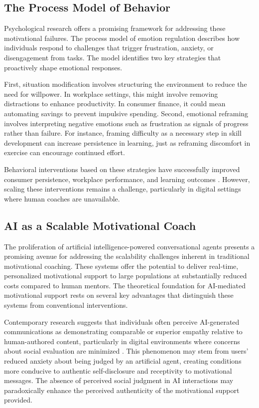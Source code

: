 \documentclass[11pt]{report}
\begin{document}
\begin{mainf}
\subsection*{The Process Model of Behavior}

Psychological research offers a promising framework for addressing these motivational failures. The process model of emotion regulation \citep{gross1998antecedent} describes how individuals respond to challenges that trigger frustration, anxiety, or disengagement from tasks. The model identifies two key strategies that proactively shape emotional responses. 

First, situation modification involves structuring the environment to reduce the need for willpower. In workplace settings, this might involve removing distractions to enhance productivity. In consumer finance, it could mean automating savings to prevent impulsive spending. Second, emotional reframing involves interpreting negative emotions such as frustration as signals of progress rather than failure. For instance, framing difficulty as a necessary step in skill development can increase persistence in learning, just as reframing discomfort in exercise can encourage continued effort.

Behavioral interventions based on these strategies have successfully improved consumer persistence, workplace performance, and learning outcomes \citep{yeager2016mindset, mrazek2018mindfulness}. However, scaling these interventions remains a challenge, particularly in digital settings where human coaches are unavailable.

\subsection*{AI as a Scalable Motivational Coach}

The proliferation of artificial intelligence-powered conversational agents presents a promising avenue for addressing the scalability challenges inherent in traditional motivational coaching. These systems offer the potential to deliver real-time, personalized motivational support to large populations at substantially reduced costs compared to human mentors. The theoretical foundation for AI-mediated motivational support rests on several key advantages that distinguish these systems from conventional interventions.

Contemporary research suggests that individuals often perceive AI-generated communications as demonstrating comparable or superior empathy relative to human-authored content, particularly in digital environments where concerns about social evaluation are minimized \citep{ovsyannikova2025third}. This phenomenon may stem from users' reduced anxiety about being judged by an artificial agent, creating conditions more conducive to authentic self-disclosure and receptivity to motivational messages. The absence of perceived social judgment in AI interactions may paradoxically enhance the perceived authenticity of the motivational support provided.


\end{mainf}
\end{document}
